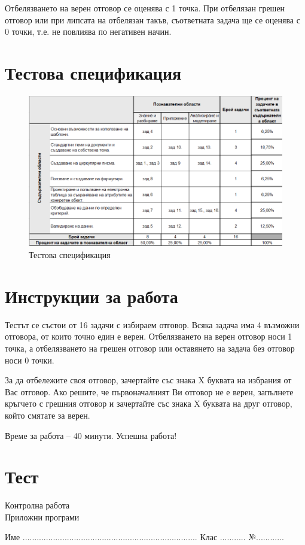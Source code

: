 Отбелязването на верен отговор се оценява с 1 точка. При отбелязан грешен отговор или при липсата на отбелязан такъв, съответната задача ще се оценява с 0 точки, т.е. не повлиява по негативен начин.

\section{Тестова спецификация}
\begin{figure}[H]
    \centering
    \includegraphics[width=\linewidth]{resources/category-of-problems.png}
    \caption{Тестова спецификация}
\end{figure}

\section{Инструкции за работа}
Тестът се състои от 16 задачи с избираем отговор. Всяка задача има 4 възможни отговора, от които точно един е верен. Отбелязването на верен отговор носи 1 точка, а отбелязването на грешен отговор или оставянето на задача без отговор носи 0 точки.

За да отбележите своя отговор, зачертайте със знака X буквата на избрания от Вас отговор. Ако решите, че първоначалният Ви отговор не е верен, запълнете кръгчето с грешния отговор и зачертайте със знака X буквата на друг отговор, който смятате за верен.

Време за работа – 40 минути.
Успешна работа!

\newpage
\section{Тест}
\begin{center} \Large
    Контролна работа \\
    Приложни програми
\end{center}
Име ........................................................................... Клас ........... №............

